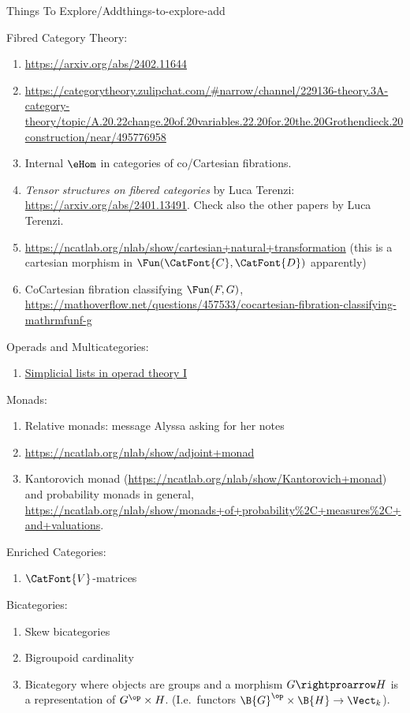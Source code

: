 \begin{remark}{Things To Explore/Add}{things-to-explore-add}
\begin{enumerate}
    \end{enumerate}
    Fibred Category Theory:
    \begin{enumerate}
        \item \url{https://arxiv.org/abs/2402.11644}
        \item \url{https://categorytheory.zulipchat.com/#narrow/channel/229136-theory.3A-category-theory/topic/A.20.22change.20of.20variables.22.20for.20the.20Grothendieck.20construction/near/495776958}
        \item Internal $\eHom$ in categories of co/Cartesian fibrations.
        \item \textit{Tensor structures on fibered categories} by Luca Terenzi: \url{https://arxiv.org/abs/2401.13491}. Check also the other papers by Luca Terenzi.
        \item \url{https://ncatlab.org/nlab/show/cartesian+natural+transformation} (this is a cartesian morphism in $\Fun(\CatFont{C},\CatFont{D})$ apparently)
        \item CoCartesian fibration classifying $\Fun(F,G)$, \url{https://mathoverflow.net/questions/457533/cocartesian-fibration-classifying-mathrmfunf-g}
    \end{enumerate}
    Operads and Multicategories:
    \begin{enumerate}
        \item \href{https://arxiv.org/abs/2405.10072}{Simplicial lists in operad theory I}
    \end{enumerate}
    Monads:
    \begin{enumerate}
        \item Relative monads: message Alyssa asking for her notes
        \item \url{https://ncatlab.org/nlab/show/adjoint+monad}
        \item Kantorovich monad (\url{https://ncatlab.org/nlab/show/Kantorovich+monad}) and probability monads in general, \url{https://ncatlab.org/nlab/show/monads+of+probability\%2C+measures\%2C+and+valuations}.
    \end{enumerate}
    Enriched Categories:
    \begin{enumerate}
        \item $\CatFont{V}$-matrices
    \end{enumerate}
    Bicategories:
    \begin{enumerate}
        \item Skew bicategories
        \item Bigroupoid cardinality
        \item Bicategory where objects are groups and a morphism $G\rightproarrow H$ is a representation of $G^{\op}\times H$. (I.e.\ functors $\B{G}^{\op}\times\B{H}\to\Vect_{k}$).

\end{enumerate}
\end{remark}
